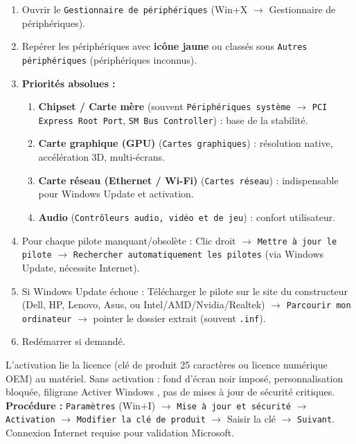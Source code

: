 \documentclass[11pt]{article}
\begin{document}
\begin{methode}
\begin{enumerate}
  \item Ouvrir le \texttt{Gestionnaire de périphériques} (Win+X $\rightarrow$ Gestionnaire de périphériques).
  \item Repérer les périphériques avec \textbf{icône jaune} ou classés sous \texttt{Autres périphériques} (périphériques inconnus).
  \item \textbf{Priorités absolues :}
  \begin{enumerate}
    \item \textbf{Chipset / Carte mère} (souvent \texttt{Périphériques système} $\rightarrow$ \texttt{PCI Express Root Port}, \texttt{SM Bus Controller}) : base de la stabilité.
    \item \textbf{Carte graphique (GPU)} (\texttt{Cartes graphiques}) : résolution native, accélération 3D, multi-écrans.
    \item \textbf{Carte réseau (Ethernet / Wi-Fi)} (\texttt{Cartes réseau}) : indispensable pour Windows Update et activation.
    \item \textbf{Audio} (\texttt{Contrôleurs audio, vidéo et de jeu}) : confort utilisateur.
  \end{enumerate}
  \item Pour chaque pilote manquant/obsolète : Clic droit $\rightarrow$ \texttt{Mettre à jour le pilote} $\rightarrow$ \texttt{Rechercher automatiquement les pilotes} (via Windows Update, nécessite Internet).
  \item Si Windows Update échoue : Télécharger le pilote sur le site du constructeur (Dell, HP, Lenovo, Asus, ou Intel/AMD/Nvidia/Realtek) $\rightarrow$ \texttt{Parcourir mon ordinateur} $\rightarrow$ pointer le dossier extrait (souvent \texttt{.inf}).
  \item Redémarrer si demandé.
\end{enumerate}
\end{methode}

\begin{propriete}
L'activation lie la licence (clé de produit 25 caractères ou licence numérique OEM) au matériel. Sans activation : fond d'écran noir imposé, personnalisation bloquée, filigrane \og Activer Windows \fg{}, pas de mises à jour de sécurité critiques. \textbf{Procédure :} \texttt{Paramètres} (Win+I) $\rightarrow$ \texttt{Mise à jour et sécurité} $\rightarrow$ \texttt{Activation} $\rightarrow$ \texttt{Modifier la clé de produit} $\rightarrow$ Saisir la clé $\rightarrow$ \texttt{Suivant}. Connexion Internet requise pour validation Microsoft.
\end{propriete}
\end{document}
